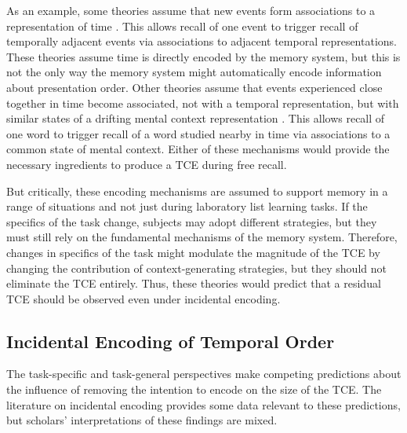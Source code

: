 \documentclass[man,natbib,floatsintext]{apa6} %
\begin{document}
As an example, some theories assume that new events form associations to a representation of time \citep{HowaEtal14a,BrowEtal07}. This allows recall of one event to trigger recall of temporally adjacent events via associations to adjacent temporal representations. These theories assume time is directly encoded by the memory system, but this is not the only way the memory system might automatically encode information about presentation order. Other theories assume that events experienced close together in time become associated, not with a temporal representation, but with similar states of a drifting mental context representation \citep{PolyEtal09,LohnEtal14,McGe32}. This allows recall of one word to trigger recall of a word studied nearby in time via associations to a common state of mental context. Either of these mechanisms would provide the necessary ingredients to produce a TCE during free recall. 

But critically, these encoding mechanisms are assumed to support memory in a range of situations and not just during laboratory list learning tasks. If the specifics of the task change, subjects may adopt different strategies, but they must still rely on the fundamental mechanisms of the memory system. Therefore, changes in specifics of the task might modulate the magnitude of the TCE by changing the contribution of context-generating strategies, but they should not eliminate the TCE entirely. Thus, these theories would predict that a residual TCE should be observed even under incidental encoding.

\subsection{Incidental Encoding of Temporal Order}
The task-specific and task-general perspectives make competing predictions about the influence of removing the intention to encode on the size of the TCE. The literature on incidental encoding provides some data relevant to these predictions, but scholars' interpretations of these findings are mixed. 
\end{document}
